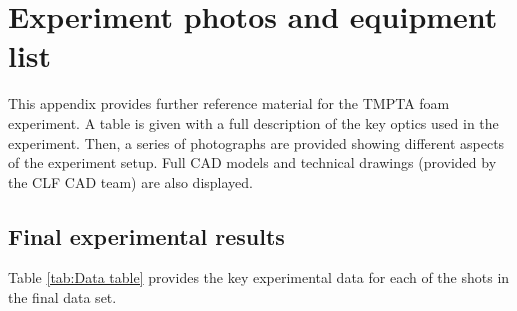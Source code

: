 

\chapter{Experiment photos and equipment list} \label{app:experimentphotos}

\minitoc

This appendix provides further reference material for the TMPTA foam experiment. A table is given with a full description of the key optics used in the experiment. Then, a series of photographs are provided showing different aspects of the experiment setup. Full CAD models and technical drawings (provided by the CLF CAD team) are also displayed.

\section{Final experimental results}

Table \ref{tab:Data table} provides the key experimental data for each of the shots in the final data set.

